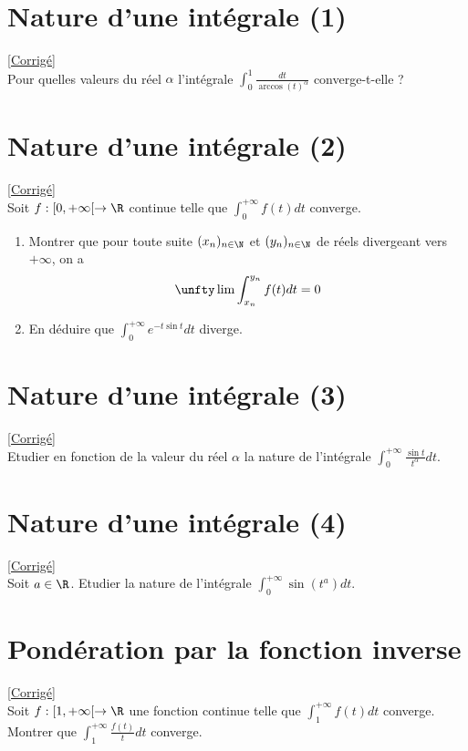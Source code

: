 \documentclass{book}
\begin{document}
	\section{Nature d'une intégrale (1) }
	\textcolor{blue}{\hyperref[Nature d'une intégrale (1) corrigé]{[Corrigé]}}\\
	\label{Nature d'une intégrale (1)}
	Pour quelles valeurs du réel $\alpha$ l'intégrale $\displaystyle\int_0^1\frac{dt}{\arccos(t)^\alpha}$ converge-t-elle ?
	
	\section{Nature d'une intégrale (2) }
	\textcolor{blue}{\hyperref[Nature d'une intégrale (2) corrigé]{[Corrigé]}}\\
	\label{Nature d'une intégrale (2)}
	Soit $f:[0,+\infty[\to \R$ continue telle que $\displaystyle\int_0^{+\infty}f(t)dt$ converge.
	\begin{enumerate}
		\item Montrer que pour toute suite $(x_n)_{n\in \N}$ et $(y_n)_{n\in \N}$ de réels divergeant vers $+\infty$, on a
		$$\unfty\lim\int_{x_n}^{y_n}f(t)dt=0$$
		\item En déduire que $\displaystyle\int_0^{+\infty}e^{-t\sin t}dt$ diverge.
	\end{enumerate}
	
	\section{Nature d'une intégrale (3) }
	\textcolor{blue}{\hyperref[Nature d'une intégrale (3) corrigé]{[Corrigé]}}\\
	\label{Nature d'une intégrale (3)}
	Etudier en fonction de la valeur du réel $\alpha$ la nature de l'intégrale $\displaystyle\int_0^{+\infty}\frac{\sin t}{t^\alpha}dt$.
	
	\section{Nature d'une intégrale (4) }
	\textcolor{blue}{\hyperref[Nature d'une intégrale (4) corrigé]{[Corrigé]}}\\
	\label{Nature d'une intégrale (4)}
	Soit $a\in \R$. Etudier la nature de l'intégrale $\displaystyle\int_0^{+\infty}\sin(t^a)dt$.\\
	
	\section{Pondération par la fonction inverse}
	\textcolor{blue}{\hyperref[Pondération par la fonction inverse corrigé]{[Corrigé]}}\\
	\label{Pondération par la fonction inverse}
	Soit $f:[1,+\infty[\to \R$ une fonction continue telle que $\displaystyle\int_1^{+\infty}f(t)dt$ converge.\\
	Montrer que $\displaystyle\int_1^{+\infty}\frac{f(t)}{t}dt$ converge.
	
\end{document}
